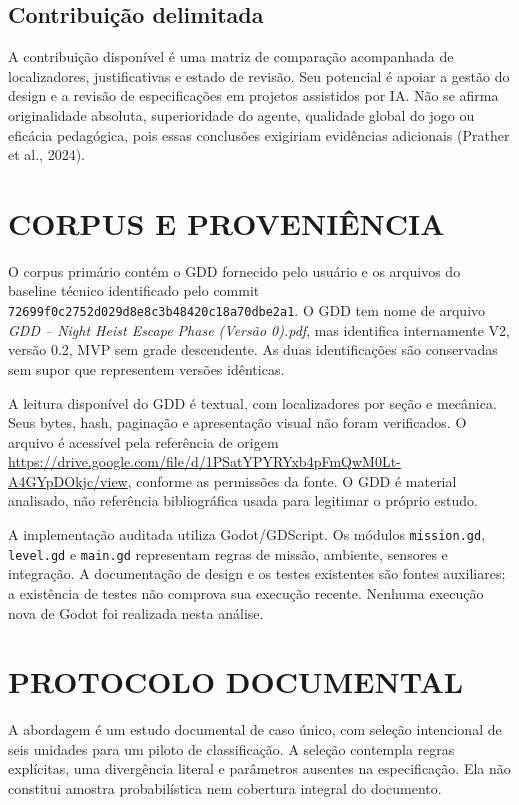 \subsection{Contribuição delimitada}
A contribuição disponível é uma matriz de comparação acompanhada de localizadores, justificativas e estado de revisão. Seu potencial é apoiar a gestão do design e a revisão de especificações em projetos assistidos por IA. Não se afirma originalidade absoluta, superioridade do agente, qualidade global do jogo ou eficácia pedagógica, pois essas conclusões exigiriam evidências adicionais (Prather et al., 2024).

\section{CORPUS E PROVENIÊNCIA}
O corpus primário contém o GDD fornecido pelo usuário e os arquivos do baseline técnico identificado pelo commit \nolinkurl{72699f0c2752d029d8e8c3b48420c18a70dbe2a1}. O GDD tem nome de arquivo \emph{GDD -- Night Heist Escape Phase (Versão 0).pdf}, mas identifica internamente V2, versão 0.2, MVP sem grade descendente. As duas identificações são conservadas sem supor que representem versões idênticas.

A leitura disponível do GDD é textual, com localizadores por seção e mecânica. Seus bytes, hash, paginação e apresentação visual não foram verificados. O arquivo é acessível pela referência de origem \url{https://drive.google.com/file/d/1PSatYPYRYxb4pFmQwM0Lt-A4GYpDOkjc/view}, conforme as permissões da fonte. O GDD é material analisado, não referência bibliográfica usada para legitimar o próprio estudo.

A implementação auditada utiliza Godot/GDScript. Os módulos \texttt{mission.gd}, \texttt{level.gd} e \texttt{main.gd} representam regras de missão, ambiente, sensores e integração. A documentação de design e os testes existentes são fontes auxiliares; a existência de testes não comprova sua execução recente. Nenhuma execução nova de Godot foi realizada nesta análise.

\section{PROTOCOLO DOCUMENTAL}
A abordagem é um estudo documental de caso único, com seleção intencional de seis unidades para um piloto de classificação. A seleção contempla regras explícitas, uma divergência literal e parâmetros ausentes na especificação. Ela não constitui amostra probabilística nem cobertura integral do documento.

